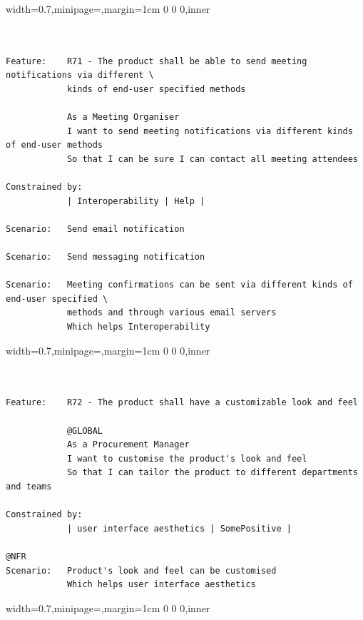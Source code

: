 \documentclass[dissertation,final]{softeng}
\newenvironment{featurecode}[1]
{ \lrbox\featurebox \begin{adjustbox}{width=#1\textwidth,minipage=\textwidth,margin=1cm 0 0 0,inner} }
{ \end{adjustbox}\endlrbox}
\newenvironment{featurelist}[2]
{
\newcommand{\setcaption}{\caption{#1}}
\newcommand{\setlabel}{\label{#2}}
}
{\begin{listing}[h!]\centering\usebox\featurebox\setcaption\setlabel\end{listing}}
\begin{document}
\begin{appendices}
\begin{featurelist}{R71 -- The product shall be able to send meeting notifications...}{lst:feature_r71}
\begin{featurecode}{0.7}
\begin{verbatim}


Feature:    R71 - The product shall be able to send meeting notifications via different \
            kinds of end-user specified methods

            As a Meeting Organiser
            I want to send meeting notifications via different kinds of end-user methods
            So that I can be sure I can contact all meeting attendees
	
Constrained by:
            | Interoperability | Help |

Scenario:   Send email notification

Scenario:   Send messaging notification

Scenario:   Meeting confirmations can be sent via different kinds of end-user specified \
            methods and through various email servers
            Which helps Interoperability
\end{verbatim}
\end{featurecode}
\end{featurelist}


\begin{featurelist}{R72 -- The product shall have a customizable look and feel}{lst:feature_r72}
\begin{featurecode}{0.7}
\begin{verbatim}


Feature:    R72 - The product shall have a customizable look and feel
			
            @GLOBAL
            As a Procurement Manager
            I want to customise the product's look and feel
            So that I can tailor the product to different departments and teams
	
Constrained by:
            | user interface aesthetics | SomePositive |

@NFR
Scenario:   Product's look and feel can be customised
            Which helps user interface aesthetics
\end{verbatim}
\end{featurecode}
\end{featurelist}

\begin{featurelist}{R74 -- The product will display availability for unreserved conference rooms}{lst:feature_r74}
\begin{featurecode}{0.7}
\begin{verbatim}



\end{verbatim}
\end{featurecode}
\end{featurelist}
\end{appendices}
\end{document}
